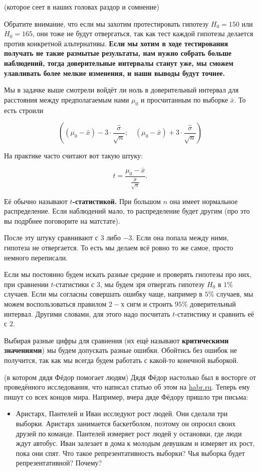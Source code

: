 \documentclass[12pt, a4paper, oneside]{article}
\theoremstyle{plain} %
\theoremstyle{definition}
\newcommand{\indef}[1]{\textbf{ \color{green} #1}}
\begin{document}
\begin{problem}{(которое сеет в наших головах раздор и сомнение)}
\begin{solution}
Обратите внимание, что если мы захотим протестировать гипотезу $H_0 = 150$ или $H_0 = 165$, они тоже не будут отвергаться, так как тест каждой гипотезы делается против конкретной альтернативы. \indef{Если мы хотим в ходе тестирования получать не такие размытые результаты, нам нужно собрать больше наблюдений, тогда доверительные интервалы станут уже, мы сможем улавливать более мелкие изменения, и наши выводы будут точнее.}

Мы в задачке выше смотрели войдёт ли ноль в доверительный интервал для расстояния между предполагаемым нами $\mu_0$ и просчитанным по выборке $\bar x$. То есть строили 

\[ 
\left((\mu_0 - \bar x) - 3 \cdot \frac{\hat \sigma}{\sqrt{n}}; \quad (\mu_0 - \bar x) + 3 \cdot \frac{\hat \sigma}{\sqrt{n}} \right)
\] 

На практике часто считают вот такую штуку: 

$$
t = \frac{\mu_0 - \bar x}{\frac{\hat \sigma}{\sqrt{n}}}.
$$

Её обычно называют \indef{$t$-статистикой.} При большом $n$ она имеет нормальное распределение. Если наблюдений мало, то распределение будет другим (про это вы подрбнее поговорите на матстате). 

После эту штуку сравнивают с $3$ либо $-3$. Если она попала между ними, гипотеза не отвергается. То есть мы делаем всё ровно то же самое, просто немного переписали. 

Если мы постоянно будем искать разные средние и проверять гипотезы про них, при сравнении $t$-статистики с $3$, мы будем зря отвергать гипотезу $H_0$ в $1\%$ случаев. Если мы согласны совершать ошибку чаще, например в $5\%$ случаев, мы можем воспользоваться правилом $2-$х сигм и строить $95\%$ доверительный интервал. Другими словами, для этого надо посчитать $t$-статистику и сравнить её с $2$. 

Выбирая разные цифры для сравнения (их ещё называют \indef{критическими значениями}) мы будем допускать разные ошибки. Обойтись без ошибок не получится, так как мы всегда будем работать с какой-то конечной выборкой.
\end{solution}


\begin{probem}{(в котором  дядя Фёдор помогает людям)}
Дядя Фёдор настолько был в восторге от проведённого исследования, что написал статью об этом на \url{habr.ru}. Теперь ему пишут со всех концов мира. Например, вчера дяде Фёдору пришло три письма: 

\begin{itemize}
	\item Аристарх, Пантелей и Иван исследуют рост людей. Они сделали три выборки. Аристарх занимается баскетболом, поэтому он опросил своих друзей по команде. Пантелей измеряет рост людей у остановки, где люди ждут автобус. Иван залезает в дома к молодым девушкам и измеряет их рост, пока они спят. Что такое репрезентативность выборки? Чья выборка будет репрезентативной? Почему? 
	

\end{itemize}
\end{probem}
\end{problem}
\end{document}
